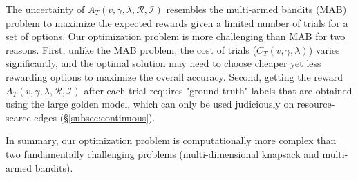 The uncertainty of $A_T(v, \gamma, \lambda, \mathcal{R}, \mathcal{I})$ resembles the multi-armed bandits (MAB) problem \cite{robbins1952some} to maximize the expected rewards given a limited number of trials for a set of options.
Our optimization problem is more challenging than MAB for two reasons.
First, unlike the MAB problem, the cost of trials ($C_T(v, \gamma, \lambda)$) varies significantly, and the optimal solution may need to choose cheaper yet less rewarding options to maximize the overall accuracy.
Second, getting the reward $A_T(v, \gamma, \lambda, \mathcal{R}, \mathcal{I})$ after each trial %
requires "ground truth" labels that are obtained using the large golden model, which can only be used judiciously on resource-scarce edges (\S\ref{subsec:continuous}).


In summary, our optimization problem is computationally more complex than two fundamentally challenging problems (multi-dimensional knapsack and multi-armed bandits).  


